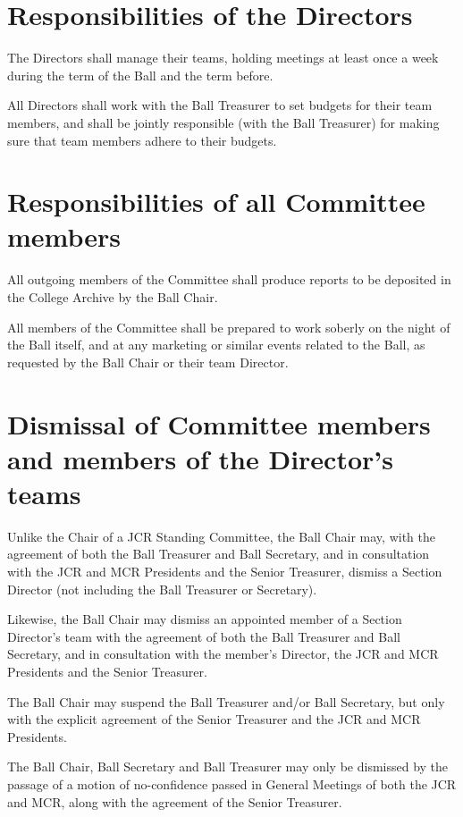 \section{Responsibilities of the Directors}

\appnpara The Directors shall manage their teams, holding meetings at least once a week during the term of the Ball and the term before.

\appnpara All Directors shall work with the Ball Treasurer to set budgets for their team members, and shall be jointly responsible (with the Ball Treasurer) for making sure that team members adhere to their budgets. 

\section{Responsibilities of all Committee members}

\appnpara All outgoing members of the Committee shall produce reports to be deposited in the College Archive by the Ball Chair.  

\appnpara All members of the Committee shall be prepared to work soberly on the night of the Ball itself, and at any marketing or similar events related to the Ball, as requested by the Ball Chair or their team Director.

\section{Dismissal of Committee members and members of the Director's teams}

\appnpara Unlike the Chair of a JCR Standing Committee, the Ball Chair may, with the agreement of both the Ball Treasurer and Ball Secretary, and in consultation with the JCR and MCR Presidents and the Senior Treasurer, dismiss a Section Director (not including the Ball Treasurer or Secretary).  

\appnpara Likewise, the Ball Chair may dismiss an appointed member of a Section Director's team with the agreement of both the Ball Treasurer and Ball Secretary, and in consultation with the member’s Director, the JCR and MCR Presidents and the Senior Treasurer.

\appnpara The Ball Chair may suspend the Ball Treasurer and/or Ball Secretary, but only with the explicit agreement of the Senior Treasurer and the JCR and MCR Presidents.  

\appnpara The Ball Chair, Ball Secretary and Ball Treasurer may only be dismissed by the passage of a motion of no-confidence passed in General Meetings of both the JCR and MCR, along with the agreement of the Senior Treasurer.  

